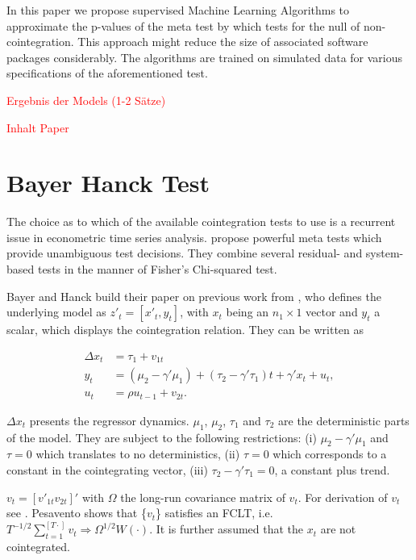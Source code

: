 \documentclass[12pt,a4paper]{article}
\begin{document}
In this paper we propose supervised Machine Learning Algorithms to
approximate the p-values of the meta test by \textcite{Bayerhanck_2012}
which tests for the null of non-cointegration. This approach might
reduce the size of associated software packages considerably. The
algorithms are trained on simulated data for various specifications of
the aforementioned test.

\textcolor{red}{Ergebnis der Models (1-2 Sätze)}

\textcolor{red}{Inhalt Paper}

\hypertarget{bayer-hanck-test}{%
\section{Bayer Hanck Test}\label{bayer-hanck-test}}

The choice as to which of the available cointegration tests to use is a
recurrent issue in econometric time series analysis.
\textcite{Bayerhanck_2012} propose powerful meta tests which provide
unambiguous test decisions. They combine several residual- and
system-based tests in the manner of Fisher's \autocite*{Fisher_1932}
Chi-squared test.

Bayer and Hanck build their paper on previous work from
\textcite{Pesavento_2004}, who defines the underlying model as
\(z'_t = [x'_t, y_t]\), with \(x_t\) being an \(n_1 \times 1\) vector
and \(y_t\) a scalar, which displays the cointegration relation. They
can be written as

\begin{align}
\Delta x_t &= \tau_1 + v_{1t} \label{eq:11} \\
y_t &= (\mu_2 - \gamma' \mu_1) + (\tau_2 - \gamma' \tau_1) t + \gamma' x_t + u_t, \label{eq:12} \\
u_t &= \rho u_{t-1} + v_{2t}. \label{eq:13}
\end{align}

\(\Delta x_t\) presents the regressor dynamics. \(\mu_1\), \(\mu_2\),
\(\tau_1\) and \(\tau_2\) are the deterministic parts of the model. They
are subject to the following restrictions: (i) \(\mu_2 - \gamma' \mu_1\)
and \(\tau = 0\) which translates to no deterministics, (ii)
\(\tau = 0\) which corresponds to a constant in the cointegrating
vector, (iii) \(\tau_2 - \gamma' \tau_1 = 0\), a constant plus trend.

\(v_t = [v'_{1t} v_{2t}]'\) with \(\Omega\) the long-run covariance
matrix of \(v_t\). For derivation of \(v_t\) see
\textcite{Pesavento_2004}. Pesavento shows that \{\(v_t\)\} satisfies an
FCLT,
i.e.~\(T^{-1/2} \sum^{[T \cdot]}_{t=1} v_t \Rightarrow \Omega^{1/2} W(\cdot)\).
It is further assumed that the \(x_t\) are not cointegrated.
\end{document}
